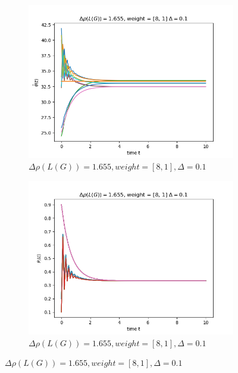 \documentclass{article}
\begin{document}
\begin{problem}
\begin{figure}[!h]
\begin{subfigure}{0.4\textwidth}
            \includegraphics[width=\textwidth]{./img/Figure_14.png}
            \caption{$\Delta \rho (L(G)) = 1.655, weight = [8,1], \Delta = 0.1$}
        \end{subfigure}
        \begin{subfigure}{0.4\textwidth}
            \includegraphics[width=\textwidth]{./img/Figure_15.png}
            \caption{$\Delta \rho (L(G)) = 1.655, weight = [8,1], \Delta = 0.1$}
        \end{subfigure}
    \end{figure}
    \begin{figure}[!h]
        \centering    
        \begin{subfigure}{0.4\textwidth}

\end{subfigure}
\end{figure}
\end{problem}
\end{document}
